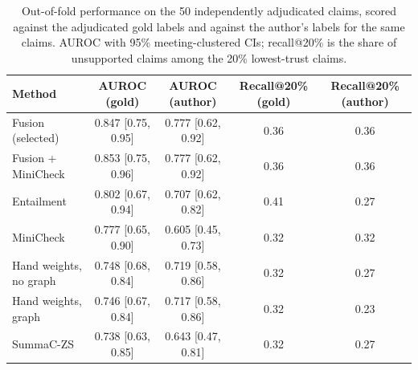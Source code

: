 \begin{table}[htbp]
\centering
\caption{Out-of-fold performance on the 50 independently adjudicated claims, scored against the adjudicated gold labels and against the author's labels for the same claims. AUROC with 95\% meeting-clustered CIs; recall@20\% is the share of unsupported claims among the 20\% lowest-trust claims.}
\label{tab:goldfusion}
\small
\begin{tabular}{@{}lcccc@{}}
\toprule
Method & AUROC (gold) & AUROC (author) & Recall@20\% (gold) & Recall@20\% (author) \\
\midrule
Fusion (selected) & 0.847 [0.75, 0.95] & 0.777 [0.62, 0.92] & 0.36 & 0.36 \\
Fusion + MiniCheck & 0.853 [0.75, 0.96] & 0.777 [0.62, 0.92] & 0.36 & 0.36 \\
Entailment & 0.802 [0.67, 0.94] & 0.707 [0.62, 0.82] & 0.41 & 0.27 \\
MiniCheck & 0.777 [0.65, 0.90] & 0.605 [0.45, 0.73] & 0.32 & 0.32 \\
Hand weights, no graph & 0.748 [0.68, 0.84] & 0.719 [0.58, 0.86] & 0.32 & 0.27 \\
Hand weights, graph & 0.746 [0.67, 0.84] & 0.717 [0.58, 0.86] & 0.32 & 0.23 \\
SummaC-ZS & 0.738 [0.63, 0.85] & 0.643 [0.47, 0.81] & 0.32 & 0.27 \\
\bottomrule
\end{tabular}
\end{table}